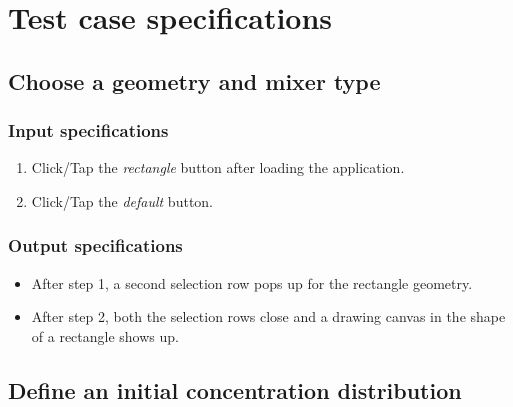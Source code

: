 \chapter{Test case specifications}
\renewcommand{\atref}[1]{\ref{at:#1}}

\section{Choose a geometry and mixer type}

\subsection*{Input specifications}
\begin{enumerate}
\item Click/Tap the \emph{rectangle} button after loading the application.
\item Click/Tap the \emph{default} button.
\end{enumerate}

\subsection*{Output specifications}
\begin{itemize}
\item After step 1, a second selection row pops up for the rectangle geometry.
\item After step 2, both the selection rows close and a drawing canvas in the shape of a rectangle shows up.
\end{itemize}

 
\section{Define an initial concentration distribution}

